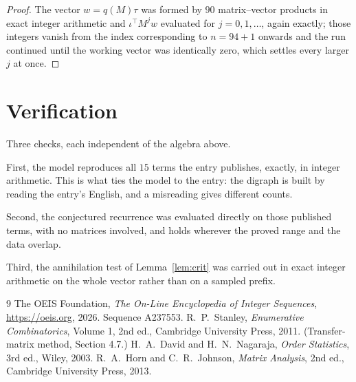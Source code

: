 \documentclass[11pt,a4paper]{article}
\theoremstyle{plain}
\theoremstyle{definition}
\begin{document}
\begin{proof}
The vector $w=q(M)\tau$ was formed by $90$ matrix--vector products in exact integer
arithmetic and $\iota^{\!\top}M^{j}w$ evaluated for $j=0,1,\dots$, again exactly; those
integers vanish from the index corresponding to $n=94+1$ onwards and the run continued
until the working vector was identically zero, which settles every larger $j$ at once.
\end{proof}

\section{Verification}

Three checks, each independent of the algebra above.

First, the model reproduces all $15$ terms the entry publishes, exactly, in integer
arithmetic. This is what ties the model to the entry: the digraph is built by reading the
entry's English, and a misreading gives different counts.

Second, the conjectured recurrence was evaluated directly on those published terms, with no
matrices involved, and holds wherever the proved range and the data overlap.

Third, the annihilation test of Lemma~\ref{lem:crit} was carried out in exact integer
arithmetic on the whole vector rather than on a sampled prefix.

\begin{thebibliography}{9}
 The OEIS Foundation, \emph{The On-Line Encyclopedia of Integer
Sequences}, \url{https://oeis.org}, 2026. Sequence A237553.
 R.~P.~Stanley, \emph{Enumerative Combinatorics}, Volume 1, 2nd ed.,
Cambridge University Press, 2011. (Transfer-matrix method, Section 4.7.)
 H.~A.~David and H.~N.~Nagaraja, \emph{Order Statistics}, 3rd ed., Wiley,
2003.
 R.~A.~Horn and C.~R.~Johnson, \emph{Matrix Analysis}, 2nd ed., Cambridge
University Press, 2013.
\end{thebibliography}
\end{document}
